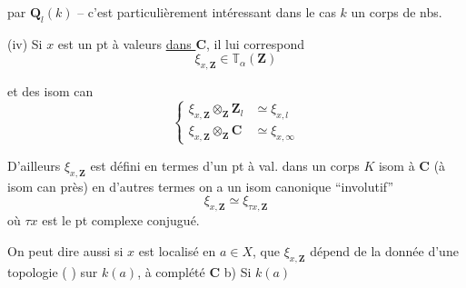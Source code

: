 par $\mathbf Q_l(k)$ -- c'est particulièrement intéressant dans le cas $k$ un corps de nbs.

(iv) Si $x$ est un pt à valeurs \uline{dans $\mathbf C$}, il lui correspond
\[
\xi_{x,\mathbf Z}\in\mathbb T_\alpha(\mathbf Z)
\]

et des isom can
\[
\left\{\begin{aligned}
\xi_{x,\mathbf Z}\otimes_{\mathbf Z}\mathbf Z_l&\simeq\xi_{x,l}\\
\xi_{x,\mathbf Z}\otimes_{\mathbf Z}\mathbf C&\simeq\xi_{x,\infty}
\end{aligned}\right.
\]

D'ailleurs $\xi_{x,\mathbf Z}$ est défini en termes d'un pt à val. dans un corps  $K$ isom à $\mathbf C$ (à isom can près) en d'autres termes on a un isom canonique ``involutif''
\[
\xi_{x,\mathbf Z}\simeq\xi_{\tau x,\mathbf Z}
\]
où $\tau x$ est le pt complexe conjugué.

 On peut dire aussi si $x$ est localisé en $a\in X$, que  $\xi_{x,\mathbf Z}$ dépend de la donnée d'une topologie ( ) sur $k(a)$, à complété $\mathbf C$ \quad b) Si $k(a)$ 

